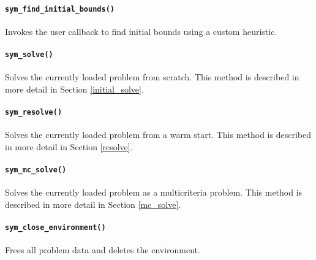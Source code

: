 \paragraph{\texttt{sym\_find\_initial\_bounds()}} Invokes the user callback to
find initial bounds using a custom heuristic.

\paragraph{\texttt{sym\_solve()}} Solves the currently loaded problem from
scratch. This method is described in more detail in Section 
\ref{initial_solve}.

\paragraph{\texttt{sym\_resolve()}} Solves the currently loaded problem from a
warm start. This method is described in more detail in Section \ref{resolve}.\\

\paragraph{\texttt{sym\_mc\_solve()}} Solves the currently loaded problem as a
multicriteria problem. This method is described in more detail in Section 
\ref{mc_solve}.

\paragraph{\texttt{sym\_close\_environment()}} Frees all problem data and
deletes the environment. \\

